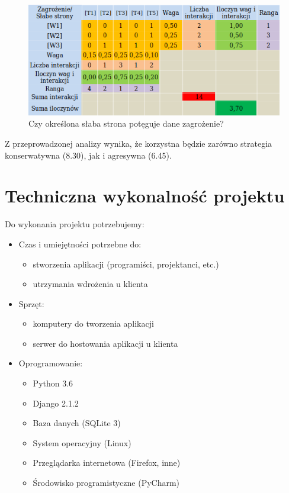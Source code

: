 \documentclass[12pt]{article}
\begin{document}
	\begin{figure}[H]
		\centering
		\includegraphics[scale=1.1]{img/swot5.png}
		\caption{Czy określona słaba strona potęguje dane zagrożenie?}
	\end{figure}
	
	Z przeprowadzonej analizy wynika, że korzystna będzie zarówno strategia konserwatywna (8.30), jak i agresywna (6.45).
	\newpage
	\section{Techniczna wykonalność projektu}
	Do wykonania projektu potrzebujemy:
	\begin{itemize}
		\item Czas i umiejętności potrzebne do:
		\begin{itemize}
			\item stworzenia aplikacji (programiści, projektanci, etc.)
			\item utrzymania wdrożenia u klienta
		\end{itemize}
		\item Sprzęt:
		\begin{itemize}
			\item komputery do tworzenia aplikacji
			\item serwer do hostowania aplikacji u klienta
		\end{itemize}
		\item Oprogramowanie:
		\begin{itemize}
			\item Python 3.6
			\item Django 2.1.2
			\item Baza danych (SQLite 3)
			\item System operacyjny (Linux)
			\item Przeglądarka internetowa (Firefox, inne)
			\item Środowisko programistyczne (PyCharm)
			
		\end{itemize}
	\end{itemize}
	
\end{document}
